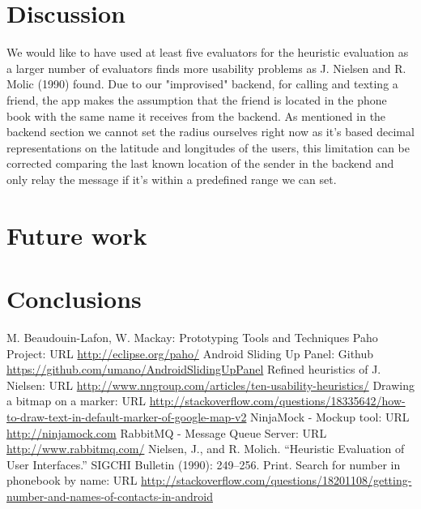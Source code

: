\documentclass[runningheads,a4paper]{llncs}
\begin{document}
\section{Discussion}
We would like to have used at least five evaluators for the heuristic evaluation as a larger number of evaluators finds more usability problems as J. Nielsen and R. Molic (1990) found.\cite{heuristics}
Due to our "improvised" backend, for calling and texting a friend, the app makes the assumption that the friend is located in the phone book with the same name it receives from the backend.
As mentioned in the backend section we cannot set the radius ourselves right now as it's based decimal representations on the latitude and longitudes of the users, this limitation can be corrected comparing the last known location of the sender in the backend and only relay the message if it's within a predefined range we can set.
\section{Future work}
\section{Conclusions}

\begin{thebibliography}{4}

 M. Beaudouin-Lafon, W. Mackay: Prototyping Tools and Techniques
 Paho Project: URL \url{http://eclipse.org/paho/}
 Android Sliding Up Panel: Github \url{https://github.com/umano/AndroidSlidingUpPanel}
Refined heuristics of J. Nielsen: URL \url{http://www.nngroup.com/articles/ten-usability-heuristics/}
 Drawing a bitmap on a marker: URL \url{http://stackoverflow.com/questions/18335642/how-to-draw-text-in-default-marker-of-google-map-v2}
 NinjaMock - Mockup tool: URL \url{http://ninjamock.com}
 RabbitMQ - Message Queue Server: URL \url{http://www.rabbitmq.com/}
Nielsen, J., and R. Molich. “Heuristic Evaluation of User Interfaces.” SIGCHI Bulletin (1990): 249–256. Print.
 Search for number in phonebook by name: URL \url{http://stackoverflow.com/questions/18201108/getting-number-and-names-of-contacts-in-android}



\end{thebibliography}
\end{document}
